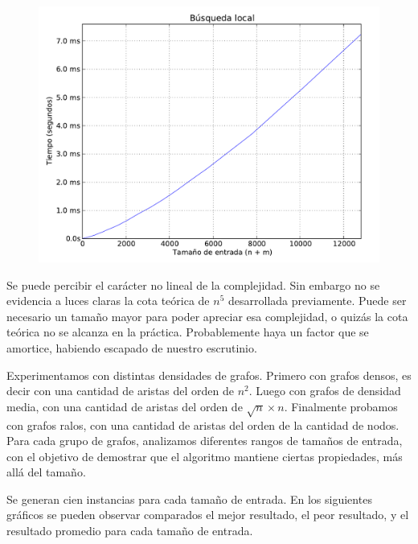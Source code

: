 \begin{figure}[H]
\begin{center}
\includegraphics[angle=0, scale=.75]{imagenes/local_search_time.pdf}
\label{grafico local}
\end{center}
\end{figure}


Se puede percibir el carácter no lineal de la complejidad. Sin embargo no se evidencia a luces claras la cota teórica de $n^5$ desarrollada
previamente. Puede ser necesario un tamaño mayor para poder apreciar esa complejidad, o quizás la cota teórica no se alcanza en la práctica.
Probablemente haya un factor que se amortice, habiendo escapado de nuestro escrutinio.

Experimentamos con distintas densidades de grafos. Primero con grafos densos, es decir con una cantidad de aristas del orden de $n^2$. Luego con
grafos de densidad media, con una cantidad de aristas del orden de $\sqrt{n} \times n$. Finalmente probamos con grafos ralos, con una cantidad de aristas
del orden de la cantidad de nodos. Para cada grupo de grafos, analizamos diferentes rangos de tamaños de entrada, con el objetivo de demostrar
que el algoritmo mantiene ciertas propiedades, más allá del tamaño.

Se generan cien instancias para cada tamaño de entrada. En los siguientes gráficos se pueden observar comparados el mejor resultado, el peor
resultado, y el resultado promedio para cada tamaño de entrada.


